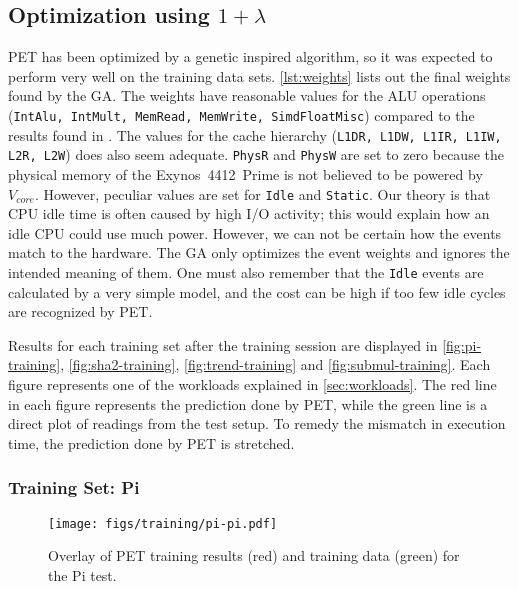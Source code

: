 \subsection{Optimization using $1 + \lambda$}

PET has been optimized by a genetic inspired algorithm, so it was expected to
perform very well on the training data sets. \autoref{lst:weights} lists out the
final weights found by the GA. The weights have reasonable values for the ALU
operations (\texttt{IntAlu, IntMult, MemRead, MemWrite, SimdFloatMisc}) compared
to the results found in \cite{rundehvatum2013exploring}. The values for the
cache hierarchy (\texttt{L1DR, L1DW, L1IR, L1IW, L2R, L2W}) does also seem
adequate. \texttt{PhysR} and \texttt{PhysW} are set to zero because the physical
memory of the Exynos~4412~Prime is not believed to be powered by $V_{core}$.
However, peculiar values are set for \texttt{Idle} and \texttt{Static}. Our
theory is that CPU idle time is often caused by high I/O activity; this would
explain how an idle CPU could use much power. However, we can not be certain how
the events match to the hardware. The GA only optimizes the event weights and
ignores the intended meaning of them. One must also remember that the
\texttt{Idle} events are calculated by a very simple model, and the cost can
be high if too few idle cycles are recognized by PET.



Results for each training set after the training session are displayed in
\autoref{fig:pi-training}, \autoref{fig:sha2-training},
\autoref{fig:trend-training} and \autoref{fig:submul-training}. Each figure
represents one of the workloads explained in \autoref{sec:workloads}. The red
line in each figure represents the prediction done by PET, while the green line
is a direct plot of readings from the test setup. To remedy the mismatch in
execution time, the prediction done by PET is stretched.


\newpage

\subsubsection{Training Set: Pi}
\begin{figure}[htb]
    \centering
    \texttt{[image: figs/training/pi-pi.pdf]}
    \caption{Overlay of PET training results (red) and training data (green) for the Pi test.}
    \label{fig:pi-training}
\end{figure}

